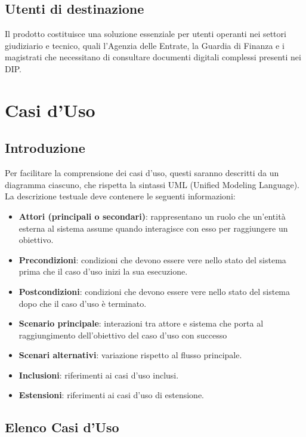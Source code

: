 \subsection{Utenti di destinazione}
Il prodotto costituisce una soluzione essenziale per utenti operanti nei settori giudiziario e tecnico, quali l'Agenzia delle Entrate, la Guardia di Finanza e i magistrati che necessitano di consultare documenti digitali complessi presenti nei DIP.

\section{Casi d'Uso}

\subsection{Introduzione}
Per facilitare la comprensione dei casi d'uso, questi saranno descritti da un diagramma ciascuno, che rispetta la sintassi UML (Unified Modeling Language).
La descrizione testuale deve contenere le seguenti informazioni:
\begin{itemize}
    \item \textbf{Attori (principali o secondari)}: rappresentano un ruolo che un'entità esterna al sistema assume quando interagisce con esso per raggiungere un obiettivo.
    \item \textbf{Precondizioni}: condizioni che devono essere vere nello stato del sistema prima che il caso d'uso inizi la sua esecuzione.
    \item \textbf{Postcondizioni}: condizioni che devono essere vere nello stato del sistema dopo che il caso d'uso è terminato.
    \item \textbf{Scenario principale}: interazioni tra attore e sistema che porta al raggiungimento dell'obiettivo del caso d'uso con successo
    \item \textbf{Scenari alternativi}: variazione rispetto al flusso principale.
    \item \textbf{Inclusioni}: riferimenti ai casi d'uso inclusi.
    \item \textbf{Estensioni}: riferimenti ai casi d'uso di estensione.
\end{itemize}

\subsection{Elenco Casi d'Uso}